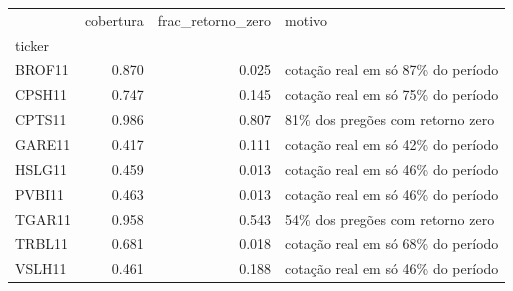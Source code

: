 \begin{tabular}{lrrl}
\toprule
 & cobertura & frac\_retorno\_zero & motivo \\
ticker &  &  &  \\
\midrule
BROF11 & 0.870 & 0.025 & cotação real em só 87\% do período \\
CPSH11 & 0.747 & 0.145 & cotação real em só 75\% do período \\
CPTS11 & 0.986 & 0.807 & 81\% dos pregões com retorno zero \\
GARE11 & 0.417 & 0.111 & cotação real em só 42\% do período \\
HSLG11 & 0.459 & 0.013 & cotação real em só 46\% do período \\
PVBI11 & 0.463 & 0.013 & cotação real em só 46\% do período \\
TGAR11 & 0.958 & 0.543 & 54\% dos pregões com retorno zero \\
TRBL11 & 0.681 & 0.018 & cotação real em só 68\% do período \\
VSLH11 & 0.461 & 0.188 & cotação real em só 46\% do período \\
\bottomrule
\end{tabular}

